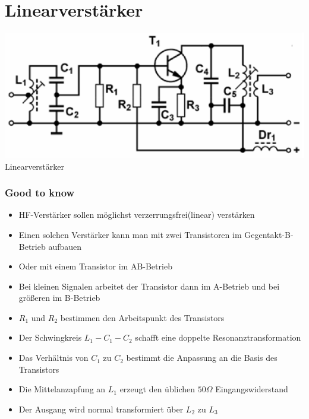 \section*{Linearverstärker}
\begin{frame}
    \begin{center}
        \includegraphics[width=1\textwidth]{a17/TG222.png}\\
       Linearverstärker\cite{bna}
    \end{center}
\end{frame}

\begin{frame}
\frametitle{Good to know}
\begin{itemize}
	\item	HF-Verstärker sollen möglichst verzerrungsfrei(linear) verstärken
	\item	Einen solchen Verstärker kann man mit zwei Transistoren im Gegentakt-B-Betrieb aufbauen
	\item	Oder mit einem Transistor im AB-Betrieb
	\item	Bei kleinen Signalen arbeitet der Transistor dann im A-Betrieb und bei größeren im B-Betrieb
	\item	$R_1$ und $R_2$ bestimmen den Arbeitspunkt des Transistors
	\item	Der Schwingkreis $L_1 - C_1 - C_2$ schafft eine doppelte Resonanztransformation
	\item	Das Verhältnis von $C_1$ zu $C_2$ bestimmt die Anpassung an die Basis des Transistors
	\item	Die Mittelanzapfung an $L_1$ erzeugt den üblichen $50 \Omega$ Eingangswiderstand
	\item	Der Ausgang wird normal transformiert über $L_2$ zu $L_3$
\end{itemize}
\end{frame}

